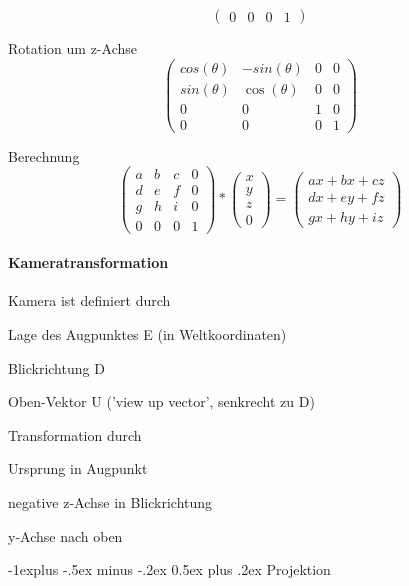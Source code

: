 \documentclass[landscape]{article}
\makeatletter
\renewcommand{\subsection}{\@startsection{subsection}{2}{0mm}%
                                {-1explus -.5ex minus -.2ex}%
                                {0.5ex plus .2ex}%
                                {\normalfont\normalsize\bfseries}}
\makeatother
\begin{document}
\begin{multicols}{3}
\begin{itemize*}
$$\begin{pmatrix}
        0            & 0 & 0           & 1
      \end{pmatrix}$$
    \item Rotation um z-Achse
    $$\begin{pmatrix}
        cos(\theta) & -sin(\theta) & 0 & 0 \\
        sin(\theta) & \cos(\theta) & 0 & 0 \\ 
        0           & 0            & 1 & 0 \\
        0           & 0            & 0 & 1
      \end{pmatrix}$$
    \item Berechnung
    $$\begin{pmatrix} a& b& c& 0\\ d& e& f& 0\\ g& h& i& 0\\ 0& 0& 0& 1\end{pmatrix}
      * \begin{pmatrix} x \\ y \\ z \\ 0 \end{pmatrix}
      = \begin{pmatrix} ax+bx+cz \\ dx+ey+fz \\ gx+hy+iz \end{pmatrix}$$
  \end{itemize*}
  
  \paragraph{Kameratransformation}
  Kamera ist definiert durch
  \begin{itemize*}
    \item Lage des Augpunktes E (in Weltkoordinaten)
    \item Blickrichtung D
    \item Oben-Vektor U ('view up vector', senkrecht zu D)
  \end{itemize*}
  Transformation durch
  \begin{itemize*}
    \item Ursprung in Augpunkt
    \item negative z-Achse in Blickrichtung
    \item y-Achse nach oben
  \end{itemize*}
  
  \subsection{Projektion}

\end{multicols}
\end{document}
